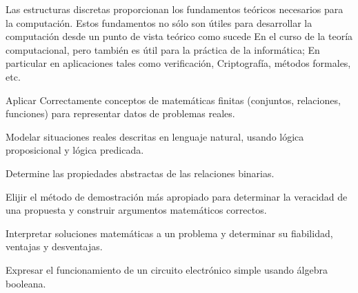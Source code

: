\begin{syllabus}


\begin{justification}

Las estructuras discretas proporcionan los fundamentos teóricos necesarios para la computación. Estos fundamentos no sólo son útiles para desarrollar la computación desde un punto de vista teórico como sucede
En el curso de la teoría computacional, pero también es útil para la práctica de la informática; En particular en aplicaciones tales como verificación,
Criptografía, métodos formales, etc.

\end{justification}

\begin{goals}
\item Aplicar Correctamente conceptos de matemáticas finitas (conjuntos, relaciones, funciones) para representar datos de problemas reales.
\item Modelar situaciones reales descritas en lenguaje natural, usando lógica proposicional y lógica predicada.
\item Determine las propiedades abstractas de las relaciones binarias.
\item Elijir el método de demostración más apropiado para determinar la veracidad de una propuesta y construir argumentos matemáticos correctos.
\item Interpretar soluciones matemáticas a un problema y determinar su fiabilidad, ventajas y desventajas.
\item Expresar el funcionamiento de un circuito electrónico simple usando álgebra booleana.
\end{goals}

\begin{outcomes}
    \item {}
    \item {}
    \item {}
\end{outcomes}

\begin{competences}
    \item {}
    \item {}
\end{competences}


\end{syllabus}
